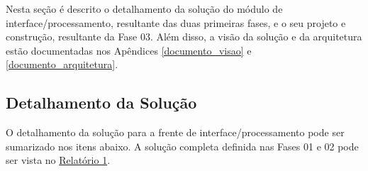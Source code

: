 \label{desenvolvimento_processamento}

Nesta seção é descrito o detalhamento da solução do módulo de interface/processamento, resultante das duas primeiras fases, e o seu projeto e construção, resultante da Fase 03. Além disso, a visão da solução e da arquitetura estão documentadas nos Apêndices \ref{documento_visao} e \ref{documento_arquitetura}.

\subsection{Detalhamento da Solução} \label{software:detalhamento_solucao}

O detalhamento da solução para a frente de interface/processamento pode ser sumarizado nos itens abaixo. A solução completa definida nas Fases 01 e 02 pode ser vista no \href{https://drive.google.com/file/d/0B5InkGKx6O-MR1B3eVYzZFpjQ3c/view?usp=sharing}{Relatório 1}.






